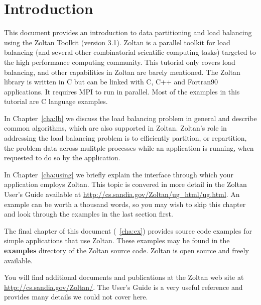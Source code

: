 %
% 
%
\chapter{Introduction}

This document provides an introduction to data partitioning
and load balancing using the Zoltan Toolkit (version 3.1).  
Zoltan is a parallel toolkit for load balancing
(and several other combinatorial scientific computing tasks) 
targeted to the high performance computing community.  
This tutorial only covers load balancing,
and other capabilities in Zoltan are barely mentioned.
The Zoltan library is written in C but can be
linked with C, C++ and Fortran90 applications.  
It requires MPI to run in parallel.
Most of the examples in this tutorial are C language examples.

In Chapter~\ref{cha:lb} we
discuss the load balancing problem in general and describe
common algorithms, which are also supported in Zoltan.
Zoltan's role in addressing the load balancing problem is to 
efficiently partition,
or repartition, the problem data across mulitple processes while an
application is running, when requested to do so by the application.


In Chapter~\ref{cha:using} we briefly explain the interface
through which your application employs Zoltan.  This topic is
convered in more detail in the
Zoltan User's Guide available at
\url{http://cs.sandia.gov/Zoltan/ug_html/ug.html}.
An example can be worth a thousand words, so you may wish to 
skip this chapter and look through the examples in the last section first.

The final chapter of this document (~\ref{cha:ex}) provides
source code examples for simple applications that use Zoltan.
These examples may be found in the \textbf{examples} directory
of the Zoltan source code.  Zoltan is open source and freely available.

You will find additional documents and publications at the
Zoltan web site at \url{http://cs.sandia.gov/Zoltan/}.
The User's Guide is a very useful reference and provides
many details we could not cover here.

